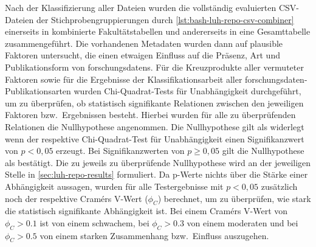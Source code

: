Nach der Klassifizierung aller Dateien wurden die vollständig evaluierten CSV-Dateien der Stichprobengruppierungen durch \cref{lst:bash-luh-repo-csv-combiner} einerseits in kombinierte Fakultätstabellen und andererseits in eine Gesamttabelle zusammengeführt.
Die vorhandenen Metadaten wurden dann auf plausible Faktoren untersucht, die einen etwaigen Einfluss auf die Präsenz, Art und Publikationsform von \glspl{forschungsdaten}.
Für die Kreuzprodukte aller vermuteter Faktoren sowie für die Ergebnisse der Klassifikationsarbeit aller \gls{forschungsdaten}-Publikationsarten wurden Chi-Quadrat-Tests für Unabhängigkeit durchgeführt, um zu überprüfen, ob statistisch signifikante Relationen zwischen den jeweiligen Faktoren bzw.~Ergebnissen besteht.
Hierbei wurden für alle zu überprüfenden Relationen die Nullhypothese angenommen.
Die Nullhypothese gilt als widerlegt wenn der respektive Chi-Quadrat-Test für Unabhängigkeit einen Signifikanzwert von $p<0,05$ erzeugt.
Bei Signifikanzwerten von $p\geqslant0,05$ gilt die Nullhypothese als bestätigt.
Die zu jeweils zu überprüfende Nullhypothese wird an der jeweiligen Stelle in \cref{sec:luh-repo-results} formuliert.
Da p-Werte nichts über die Stärke einer Abhängigkeit aussagen, wurden für alle Testergebnisse mit $p<0,05$ zusätzlich noch der respektive Cramérs V-Wert ($\phi_C$) berechnet, um zu überprüfen, wie stark die statistisch signifikante Abhängigkeit ist.
Bei einem Cramérs V-Wert von $\phi_C>\num{0,1}$ ist von einem schwachem, bei $\phi_C>\num{0,3}$ von einem moderaten und bei $\phi_C>\num{0,5}$ von einem starken Zusammenhang bzw.~Einfluss auszugehen.

